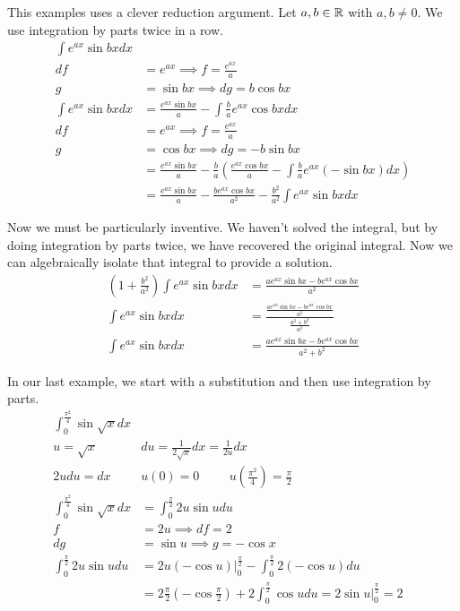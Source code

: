 \documentclass[fleqn]{report}
\begin{document}
\begin{example}
This examples uses a clever
reduction argument. Let $a,b \in \mathbb{R}$ with $a,b \neq 0$. We
use integration by parts twice in a row.
\begin{align*}
\int e^{ax} \sin bx dx & \\
df & = e^{ax} \implies f = \frac{e^{ax}}{a} \\
g & = \sin bx \implies dg = b \cos bx \\
\int e^{ax} \sin bx dx & = \frac{e^{ax} \sin bx}{a} - \int
\frac{b}{a} e^{ax} \cos bx dx \\
df & = e^{ax} \implies f = \frac{e^{ax}}{a} \\
g & = \cos bx \implies dg = -b \sin bx \\
& = \frac{e^{ax}\sin bx}{a} - \frac{b}{a} \left( \frac{e^{ax}
\cos bx}{a} - \int \frac{b}{a} e^{ax} (-\sin bx) dx \right) \\
& = \frac{e^{ax}\sin bx}{a} - \frac{be^{ax} \cos bx}{a^2} -
\frac{b^2}{a^2} \int e^{ax} \sin bx dx 
\end{align*}

Now we must be particularly inventive. We haven't
solved the integral, but by doing integration by parts twice,
we have recovered the original integral. Now we can
algebraically isolate that integral to provide a solution.
\begin{align*}
\left( 1 + \frac{b^2}{a^2} \right) \int e^{ax} \sin bx dx & =
\frac{ae^{ax} \sin b x - b e^{ax} \cos bx}{a^2} \\
\int e^{ax} \sin bx dx & = \frac{\frac{ae^{ax} \sin b x - b
e^{ax} \cos bx}{a^2}}{\frac{a^2+b^2}{a^2}} \\
\int e^{ax} \sin bx dx & = \frac{ae^{ax} \sin b x - b
e^{ax} \cos bx}{a^2+b^2}
\end{align*}
\end{example}

\begin{example}
In our last example, we start with a substitution and
then use integration by parts.
\begin{align*}
\int_0^{\frac{\pi^2}{4}} \sin \sqrt{x} dx & \\
u = \sqrt{x} & du = \frac{1}{2\sqrt{x}} dx = \frac{1}{2u} dx \\
2udu = dx & u(0) = 0 \hspace{1cm} u(\frac{\pi^2}{4}) =
\frac{\pi}{2} \\
\int_0^{\frac{\pi^2}{4}} \sin \sqrt{x} dx & =
\int_0^{\frac{\pi}{2}} 2u \sin u du & \\
f & = 2u \implies df = 2 \\
dg & = \sin u \implies g = -\cos x\\
\int_0^{\frac{\pi}{2}} 2u \sin u du & = 2u \left. (-\cos u)
\right|_0^{\frac{\pi}{2}} - \int_0^{\frac{\pi}{2}} 2 (-\cos u)
du \\
& = 2 \frac{\pi}{2} \left( -\cos \frac{\pi}{2} \right) + 2
\int_0^{\frac{\pi}{2}} \cos u du = 2 \left. \sin u
\right|_0^{\frac{\pi}{2}} = 2
\end{align*}
\end{example}
\end{document}
